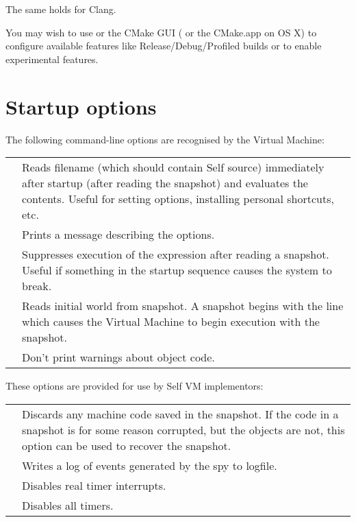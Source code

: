 \documentclass[letterpaper,10pt,english]{sphinxmanual}
\begin{document}
The same holds for Clang.

You may wish to use  or the CMake GUI ( or the CMake.app on OS X) to configure available features like Release/Debug/Profiled builds or to enable experimental features.


\section{Startup options}
\label{\detokenize{vmref:startup-options}}
The following command-line options are recognised by the Virtual Machine:

\noindent\begin{tabulary}{\linewidth}{p{2.5cm} p{13cm}}
\hline
{}\relax &\relax \\
\hline
{}
&
Reads filename (which should contain Self source) immediately after startup (after reading the snapshot) and evaluates the contents. Useful for setting options, installing personal shortcuts, etc.
\\
\hline
{}
&
Prints a message describing the options.
\\
\hline
{}
&
Suppresses execution of the expression  after reading a snapshot. Useful if something in the startup sequence causes the system to break.
\\
\hline
{}
&
Reads initial world from snapshot. A snapshot begins with the line  which causes the Virtual Machine to begin execution with the snapshot.
\\
\hline
{}
&
Don’t print warnings about object code.
\\
\hline\end{tabulary}


These options are provided for use by Self VM implementors:

\noindent\begin{tabulary}{\linewidth}{p{2.5cm} p{13cm}}
\hline
{}\relax &\relax \\
\hline
{}
&
Discards any machine code saved in the snapshot. If the code in a snapshot is for some reason corrupted, but the objects are not, this option can be used to recover the snapshot.
\\
\hline
{}
&
Writes a log of events generated by the spy to logfile.
\\
\hline
{}
&
Disables real timer interrupts.
\\
\hline
{}
&
Disables all timers.
\\
\hline\end{tabulary}
\end{document}
